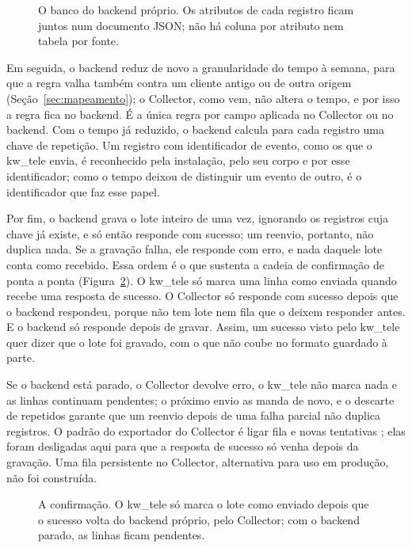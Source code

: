 \begin{figure}[!ht]
  \centering
  
  \caption{O banco do backend próprio. Os atributos de cada registro ficam
    juntos num documento JSON; não há coluna por atributo nem tabela por
    fonte.}
  \label{fig:esquema-backend}
\end{figure}

Em seguida, o backend reduz de novo a granularidade do tempo à semana, para
que a regra valha também contra um cliente antigo ou de outra origem
(Seção~\ref{sec:mapeamento}); o Collector, como vem, não altera o tempo, e por
isso a regra fica no backend. É a única regra por campo aplicada no Collector
ou no backend. Com o tempo já reduzido, o backend calcula para cada registro
uma chave de repetição. Um registro com identificador de evento, como os que o
kw\_tele envia, é reconhecido pela instalação, pelo seu corpo e por esse
identificador; como o tempo deixou de distinguir um evento de outro, é o
identificador que faz esse papel.

Por fim, o backend grava o lote inteiro de uma vez, ignorando os registros
cuja chave já existe, e só então responde com sucesso; um reenvio, portanto,
não duplica nada. Se a gravação falha, ele responde com erro, e nada daquele
lote conta como recebido. Essa ordem é o que sustenta a cadeia de confirmação de ponta a ponta
(Figura~\ref{fig:confirmacao}). O kw\_tele só marca uma linha como enviada quando recebe uma
resposta de sucesso. O Collector só responde com sucesso depois que o backend
respondeu, porque não tem lote nem fila que o deixem responder antes. E o
backend só responde depois de gravar. Assim, um sucesso visto pelo kw\_tele
quer dizer que o lote foi gravado, com o que não coube no formato guardado à
parte.

Se o backend está parado, o Collector devolve erro, o kw\_tele não marca nada
e as linhas continuam pendentes; o próximo envio as manda de novo, e o
descarte de repetidos garante que um reenvio depois de uma falha parcial não
duplica registros. O padrão do exportador do Collector é ligar fila e novas
tentativas \citep{otel_collector_exporterhelper_v0_121_0}; elas foram
desligadas aqui para que a resposta de sucesso só venha depois da gravação.
Uma fila persistente no Collector, alternativa para uso em produção, não foi
construída.

\begin{figure}[!ht]
  \centering
  \resizebox{\textwidth}{!}{}
  \caption{A confirmação. O kw\_tele só marca o lote como enviado depois que o
    sucesso volta do backend próprio, pelo Collector; com o backend parado, as
    linhas ficam pendentes.}
  \label{fig:confirmacao}
\end{figure}

